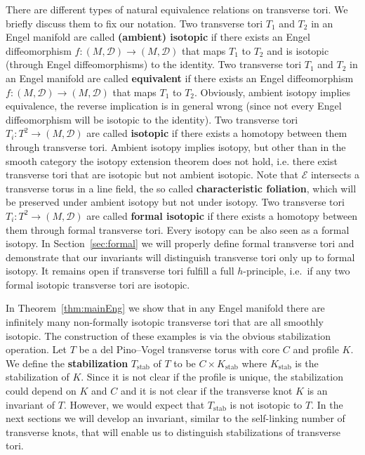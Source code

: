\documentclass{amsart} %
\newcommand{\D}{\mathcal{D}}
\newcommand{\E}{\mathcal{E}}
\newcommand{\Tstab}{T_{\mathrm{stab}}}
\newcommand{\Kstab}{K_{\mathrm{stab}}}
\theoremstyle{thm}
\theoremstyle{definition}
\begin{document}
There are different types of natural equivalence relations on transverse tori. We briefly discuss them to fix our notation.
Two transverse tori $T_1$ and $T_2$ in an Engel manifold are called \textbf{(ambient) isotopic} if there exists an Engel diffeomorphism $f\colon(M,\D)\rightarrow(M,\D)$ that maps $T_1$ to $T_2$ and is isotopic (through Engel diffeomorphisms) to the identity.
Two transverse tori $T_1$ and $T_2$ in an Engel manifold are called \textbf{equivalent} if there exists an Engel diffeomorphism $f\colon(M,\D)\rightarrow(M,\D)$ that maps $T_1$ to $T_2$.
Obviously, ambient isotopy implies equivalence, the reverse implication is in general wrong (since not every Engel diffeomorphism will be isotopic to the identity).
Two transverse tori $T_i\colon T^2\rightarrow (M,\D)$ are called \textbf{isotopic} if there exists a homotopy between them through transverse tori.
Ambient isotopy implies isotopy, but other than in the smooth category the isotopy extension theorem does not hold, i.e. there exist transverse tori that are isotopic but not ambient isotopic. Note that $\E$ intersects a transverse torus in a line field, the so called \textbf{characteristic foliation}, which will be preserved under ambient isotopy but not under isotopy. 
Two transverse tori $T_i\colon T^2\rightarrow (M,\D)$ are called \textbf{formal isotopic} if there exists a homotopy between them through formal transverse tori. Every isotopy can be also seen as a formal isotopy. In Section~\ref{sec:formal} we will properly define formal transverse tori and demonstrate that our invariants will distinguish transverse tori only up to formal isotopy. It remains open if transverse tori fulfill a full $h$-principle, i.e.\ if any two formal isotopic transverse tori are isotopic.

In Theorem~\ref{thm:mainEng} we show that in any Engel manifold there are infinitely many non-formally isotopic transverse tori that are all smoothly isotopic. The construction of these examples is via the obvious stabilization operation. Let $T$ be a del Pino--Vogel transverse torus with core $C$ and profile $K$. We define the \textbf{stabilization} $\Tstab$ of $T$ to be $C\times \Kstab$ where $\Kstab$ is the stabilization of $K$.
Since it is not clear if the profile is unique, the stabilization could depend on $K$ and $C$ and it is not clear if the transverse knot $K$ is an invariant of $T$. However, we would expect that $\Tstab$ is not isotopic to $T$. In the next sections we will develop an invariant, similar to the self-linking number of transverse knots, that will enable us to distinguish stabilizations of transverse tori.
\end{document}
